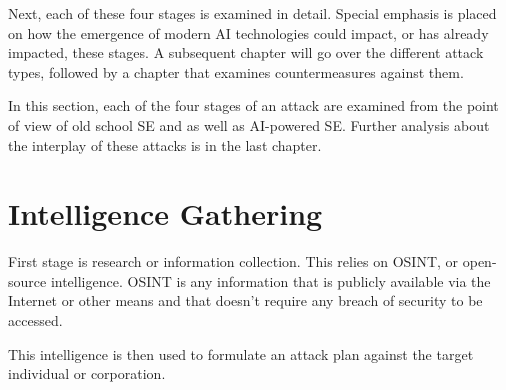 Next, each of these four stages is examined in detail. Special emphasis is placed on how the emergence of modern AI technologies could impact, or has already impacted, these stages. A subsequent chapter will go over the different attack types, followed by a chapter that examines countermeasures against them.

In this section, each of the four stages of an attack are examined from the point of view of old school SE and as well as AI-powered SE. Further analysis about the interplay of these attacks is in the last chapter.





\section{Intelligence Gathering}
\begin{comment}
    
    - OSINT has been defined in a preceending chapter
    - Cover the phase of intel gathering more broadly than just OSINT
    - Following and observing people entering and exiting premises
    - Calling the company for more information (after OSINT)
    - Use of pretexting in intel gathering
    - Gather info, understand vulnerabilities, habits, potential entry/exit points
    - Company website, social media profiles (inlc. old), public info e.g. from corporate databases (YTJ)
    - Physical surveillance of targets
    - AI can augment data collection and analysis (inc big amounts of data), increases speed of intel gathering and the attack itself
    - NLP may help in parsing the info

\end{comment}


First stage is research or information collection. This relies on OSINT, or open-source intelligence. OSINT is any information that is publicly available via the Internet or other means and that doesn't require any breach of security to be accessed.

This intelligence is then used to formulate an attack plan against the target individual or corporation.





